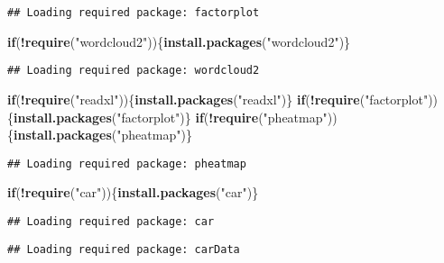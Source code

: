 \documentclass[
]{article}
\newenvironment{Shaded}{\begin{snugshade}}{\end{snugshade}}
\newcommand{\ControlFlowTok}[1]{\textcolor[rgb]{0.13,0.29,0.53}{\textbf{#1}}}
\newcommand{\KeywordTok}[1]{\textcolor[rgb]{0.13,0.29,0.53}{\textbf{#1}}}
\newcommand{\NormalTok}[1]{#1}
\newcommand{\OperatorTok}[1]{\textcolor[rgb]{0.81,0.36,0.00}{\textbf{#1}}}
\newcommand{\StringTok}[1]{\textcolor[rgb]{0.31,0.60,0.02}{#1}}
\begin{document}
\begin{verbatim}
## Loading required package: factorplot
\end{verbatim}

\begin{Shaded}
\begin{Highlighting}[]
\ControlFlowTok{if}\NormalTok{(}\OperatorTok{!}\KeywordTok{require}\NormalTok{(}\StringTok{"wordcloud2"}\NormalTok{))\{}\KeywordTok{install.packages}\NormalTok{(}\StringTok{"wordcloud2"}\NormalTok{)\}}
\end{Highlighting}
\end{Shaded}

\begin{verbatim}
## Loading required package: wordcloud2
\end{verbatim}

\begin{Shaded}
\begin{Highlighting}[]
\ControlFlowTok{if}\NormalTok{(}\OperatorTok{!}\KeywordTok{require}\NormalTok{(}\StringTok{"readxl"}\NormalTok{))\{}\KeywordTok{install.packages}\NormalTok{(}\StringTok{"readxl"}\NormalTok{)\}}
\ControlFlowTok{if}\NormalTok{(}\OperatorTok{!}\KeywordTok{require}\NormalTok{(}\StringTok{"factorplot"}\NormalTok{))\{}\KeywordTok{install.packages}\NormalTok{(}\StringTok{"factorplot"}\NormalTok{)\}}
\ControlFlowTok{if}\NormalTok{(}\OperatorTok{!}\KeywordTok{require}\NormalTok{(}\StringTok{"pheatmap"}\NormalTok{))\{}\KeywordTok{install.packages}\NormalTok{(}\StringTok{"pheatmap"}\NormalTok{)\}}
\end{Highlighting}
\end{Shaded}

\begin{verbatim}
## Loading required package: pheatmap
\end{verbatim}

\begin{Shaded}
\begin{Highlighting}[]
\ControlFlowTok{if}\NormalTok{(}\OperatorTok{!}\KeywordTok{require}\NormalTok{(}\StringTok{"car"}\NormalTok{))\{}\KeywordTok{install.packages}\NormalTok{(}\StringTok{"car"}\NormalTok{)\}}
\end{Highlighting}
\end{Shaded}

\begin{verbatim}
## Loading required package: car
\end{verbatim}

\begin{verbatim}
## Loading required package: carData
\end{verbatim}
\end{document}
